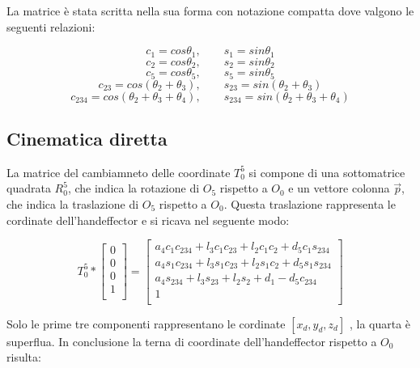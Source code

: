 \documentclass[a4paper]{article}
\begin{document}
    \begin{text}
        La matrice è stata scritta nella sua forma con notazione compatta dove valgono le seguenti relazioni: \\
    \end{text}
    
    \[c_1 = cos\theta_1, \qquad s_1 = sin\theta_1\]
    \[c_2 = cos\theta_2, \qquad s_2 = sin\theta_2\]
    \[c_5 = cos\theta_5, \qquad s_5 = sin\theta_5\]
    \[c_{23} = cos(\theta_2 + \theta_3), \qquad s_{23} = sin(\theta_2 + \theta_3)\]
    \[c_{234} = cos(\theta_2 + \theta_3 + \theta_4), \qquad s_{234} = sin(\theta_2 + \theta_3 + \theta_4)\]
    
    \subsection{Cinematica diretta}
    
    \begin{text}
        La matrice del cambiamneto delle coordinate $T_0^5$ si compone di una sottomatrice quadrata $R_0^5$, che indica la rotazione di $O_5$ rispetto a $O_0$ e un vettore colonna $\vec{p}$, che indica la traslazione di $O_5$ rispetto a $O_0$. Questa traslazione rappresenta le cordinate dell'handeffector e si ricava nel seguente modo:\\
    \end{text}
    
    \[
    T_0^5*
    \begin{bmatrix}
        0\\[1ex]
        0\\[1ex]
        0\\[1ex]
        1\\[1ex]  
    \end{bmatrix}
    =
    \begin{bmatrix}
        a_4 c_1 c_{234} + l_3 c_1 c_{23} + l_2 c_1 c_2 + d_5 c_1 s_{234}\\[1ex]
        a_4 s_1 c_{234} + l_3 s_1 c_{23} + l_2 s_1 c_2 + d_5 s_1 s_{234}\\[1ex]
        a_4 s_{234} + l_3 s_{23} + l_2 s_2 + d_1 - d_5 c_{234}\\[1ex]
        1\\[1ex]  
    \end{bmatrix}
    \]
    
    \begin{text}
        Solo le prime tre componenti rappresentano le cordinate $[x_d, y_d, z_d]$ , la quarta è superflua. In conclusione la terna di coordinate dell'handeffector rispetto a $O_0$ risulta:
    \end{text}
    
\end{document}
